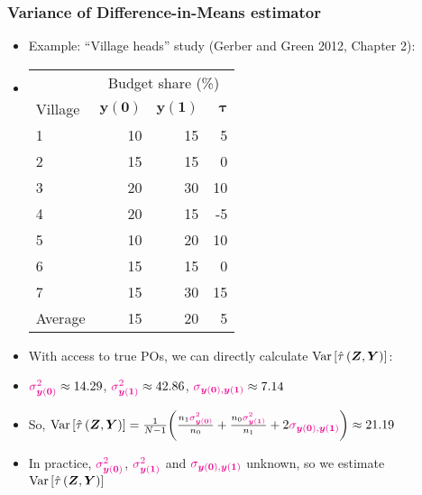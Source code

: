 \documentclass[table, xcolor = {dvipsnames}, 9pt]{beamer}
\theoremstyle{plain}
\newcommand{\mh}[1]{{\color{magenta}{#1}}}
\DeclareMathOperator{\Var}{\rm{Var}}
\begin{document}
\begin{frame}
\frametitle{Variance of Difference-in-Means estimator}
\begin{itemize}
\item Example: ``Village heads'' study (Gerber and Green 2012, Chapter 2): \vspace{0.1in}
\item[]
\begin{center}
\begin{tabular}{l|rrr} \hline
& \multicolumn{3}{c}{Budget share (\%)} \\
Village &$\bm{\bm{y}(\bm{0})}$& $\bm{\bm{y}(\bm{1})}$& $\bm{\tau}$  \\ \hline
1& 10 & 15  & 5  \\
2& 15 & 15  & 0   \\ 
3& 20 & 30  & 10   \\
4& 20 & 15  & -5   \\
5& 10 & 20  & 10   \\
6& 15 & 15  & 0   \\
7& 15 & 30  & 15   \\ \hline
Average & 15 & 20 & 5  \\ \hline
\end{tabular}
\end{center} \vspace{0.5em} \pause
\item With access to true POs, we can directly calculate $\Var\left[\hat{\tau}\left(\bm{Z}, \bm{Y}\right)\right]$: \vspace{0.5em}
\item[] $\mh{\sigma^2_{\bm{y}(\bm{0})}} \approx 14.29$, $\mh{\sigma^2_{\bm{y}(\bm{1})}} \approx 42.86$, $\mh{\sigma_{\bm{y}(\bm{0}), \bm{y}(\bm{1})}} \approx 7.14$ \vspace{0.5em}
\item So, $\Var\left[\hat{\tau}\left(\bm{Z}, \bm{Y}\right)\right] = \frac{1}{N - 1}\bigg(\frac{n_1 \mh{\sigma^2_{\bm{y}(\bm{0})}}}{n_0} + \frac{n_0 \mh{\sigma^2_{\bm{y}(\bm{1})}}}{n_1} + 2\mh{\sigma_{\bm{y}(\bm{0}), \bm{y}(\bm{1})}}\bigg) \approx 21.19$ \pause \vspace{0.5em}
\item In practice, $\mh{\sigma^2_{\bm{y}(\bm{0})}}$, $\mh{\sigma^2_{\bm{y}(\bm{1})}}$ and $\mh{\sigma_{\bm{y}(\bm{0}), \bm{y}(\bm{1})}}$ unknown, so we estimate $\Var\left[\hat{\tau}\left(\bm{Z}, \bm{Y}\right)\right]$
\end{itemize}
\end{frame}
\end{document}
